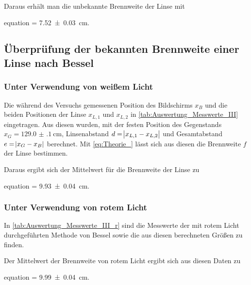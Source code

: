 	
	Daraus erhält man die unbekannte Brennweite der Linse mit 
	 \begin{empheq}{equation}
			\label{val:Auswertung_Unbekannt}
			 = \SI{7.52(3)}{\centi\meter}.
	 \end{empheq}
	

\subsection{Überprüfung der bekannten Brennweite einer Linse nach Bessel}

	\subsubsection{Unter Verwendung von weißem Licht}
	
		Die während des Versuchs gemessenen Position des Bildschirms $x_{B}$ und
		die beiden Positionen der Linse $x_{L,1}$ und $x_{L,2}$ in \cref{tab:Auswertung_Messwerte_III} eingetragen. 
		Aus diesen wurden, mit der festen Position des Gegenstands $x_{G} = \SI{129.0(1)}{\centi\meter}$,
		Linsenabstand $d = \envert{x_{L,1} - x_{L,2}}$ und Gesamtabstand $e = \envert{x_{G}- x_{B}}$ 
		berechnet. Mit \cref{eq:Theorie_} lässt sich aus diesen die Brennweite $f$ der Linse bestimmen.
		
		
		
		Daraus ergibt sich der Mittelwert für die Brennweite der Linse zu
		\begin{empheq}{equation}
			\label{val:Auswertung_BesselWeis}
			 = \SI{9.93(4)}{\centi\meter}.
		\end{empheq}
		
	\subsubsection{Unter Verwendung von rotem Licht}	
		
		In \cref{tab:Auswertung_Messwerte_III_r} sind die Messwerte der mit rotem
		Licht durchgeführten Methode von Bessel sowie die aus diesen berechneten
		Größen zu finden.
		
		
		
		 Der Mittelwert der Brennweite von rotem Licht ergibt sich aus diesen Daten zu
		\begin{empheq}{equation}
			\label{val:Auswertung_BesselRot}
			 = \SI{9.99(4)}{\centi\meter}.
		\end{empheq}		 
		
